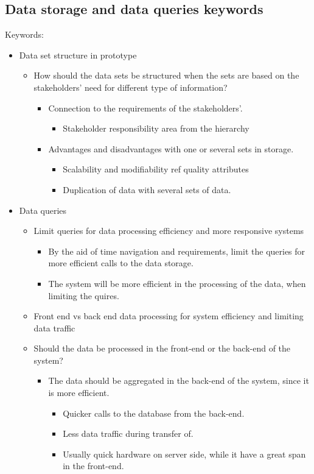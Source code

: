 \subsection{Data storage and data queries keywords} %
\label{sub:data_storage_and_data_queries_keywords}
Keywords:
\begin{itemize}
	\item Data set structure in prototype
	\begin{itemize}
		\item How should the data sets be structured when the sets are based 
		on the stakeholders' need for different type of information?
		\begin{itemize}
			\item Connection to the requirements of the stakeholders'.
			\begin{itemize}
				\item Stakeholder responsibility area from the hierarchy
			\end{itemize}
			\item Advantages and disadvantages with one or several sets in storage.
			\begin{itemize}
				\item Scalability and modifiability ref quality attributes \cite{Bass:2012:SAP:2392670}
				\item Duplication of data with several sets of data.
			\end{itemize}
		\end{itemize}
	\end{itemize}
	\item Data queries
	\begin{itemize}
		\item Limit queries for data processing efficiency 
		and more responsive systems
		\begin{itemize}
			\item By the aid of time navigation and requirements, limit the 
			queries for more efficient calls to the data storage.
			\item The system will be more efficient in the processing of the 
			data, when limiting the quires.
		\end{itemize}
		\item Front end vs back end data processing for system efficiency and
		limiting data traffic
		\item Should the data be processed in the front-end or the back-end 
		of the system?
		\begin{itemize}
			\item The data should be aggregated in the back-end of the system, 
			since it is more efficient.
			\begin{itemize}
				\item Quicker calls to the database from the back-end.
				\item Less data traffic during transfer of.
				\item Usually quick hardware on server side, while it have a 
				great span in the front-end.
			\end{itemize}
		\end{itemize}
	\end{itemize}
\end{itemize}

